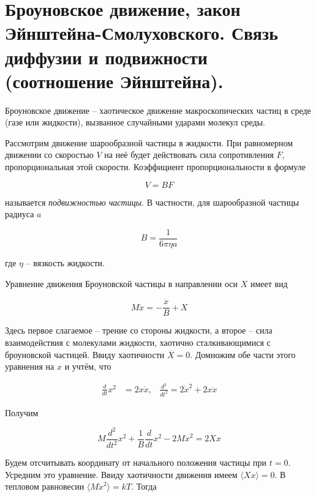 \section{Броуновское движение, закон Эйнштейна-Смолуховского. Связь диффузии и подвижности (соотношение Эйнштейна).}

\begin{definition}
    Броуновское движение -- хаотическое движение макроскопических частиц в среде (газе или жидкости), вызванное случайными ударами молекул среды.
\end{definition}

Рассмотрим движение шарообразной частицы в жидкости. При равномерном движении со скоростью $V$ на неё будет действовать сила сопротивления $F$, пропорциональная этой скорости. Коэффициент пропорциональности в формуле

\begin{equation}
    V = B F
\end{equation}

\noindent
называется \textit{подвижностью частицы}. В частности, для шарообразной частицы радиуса $a$

\begin{equation}
    B = \frac{1}{6 \pi \eta a}
\end{equation}

\noindent
где $\eta$ -- вязкость жидкости.

Уравнение движения Броуновской частицы в направлении оси $X$ имеет вид

\begin{equation*}
    M \ddot x = - \frac{\dot x}{B} + X
\end{equation*}

\noindent
Здесь первое слагаемое -- трение со стороны жидкости, а второе -- сила взаимодействия с молекулами жидкости, хаотично сталкивающимися с броуновской частицей. Ввиду хаотичности $\overline{X} = 0$. Домножим обе части этого уравнения на $x$ и учтём, что

\begin{align*}
    \frac{d}{dt} x^2 &= 2 x \dot x, & \frac{d^2}{dt^2} = 2 \dot x^2 + 2 x \ddot x
\end{align*}

\noindent
Получим

\begin{equation*}
    M \frac{d^2}{dt^2} x^2 + \frac{1}{B} \frac{d}{dt} x^2 - 2 M \dot x^2 = 2 X x
\end{equation*}

\noindent
Будем отсчитывать координату от начального положения частицы при $t = 0$. Усредним это уравнение. Ввиду хаотичности движения имеем $\langle X x \rangle = 0$. В тепловом равновесии $\langle M \dot x^2 \rangle = k T$. Тогда

